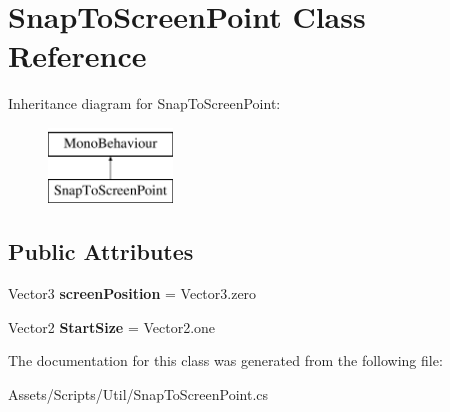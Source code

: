 \hypertarget{class_snap_to_screen_point}{}\section{Snap\+To\+Screen\+Point Class Reference}
\label{class_snap_to_screen_point}
Inheritance diagram for Snap\+To\+Screen\+Point\+:\begin{figure}[H]
\begin{center}
\leavevmode
\includegraphics[height=2.000000cm]{class_snap_to_screen_point}
\end{center}
\end{figure}
\subsection*{Public Attributes}
\begin{DoxyCompactItemize}
\item 
Vector3 {\bfseries screen\+Position} = Vector3.\+zero\hypertarget{class_snap_to_screen_point_af16a0e4b3b605f83f8382f759b7e2ef4}{}\label{class_snap_to_screen_point_af16a0e4b3b605f83f8382f759b7e2ef4}

\item 
Vector2 {\bfseries Start\+Size} = Vector2.\+one\hypertarget{class_snap_to_screen_point_a1c894fdec5879ad749eb2a0fb86c4637}{}\label{class_snap_to_screen_point_a1c894fdec5879ad749eb2a0fb86c4637}

\end{DoxyCompactItemize}


The documentation for this class was generated from the following file\+:\begin{DoxyCompactItemize}
\item 
Assets/\+Scripts/\+Util/Snap\+To\+Screen\+Point.\+cs\end{DoxyCompactItemize}
